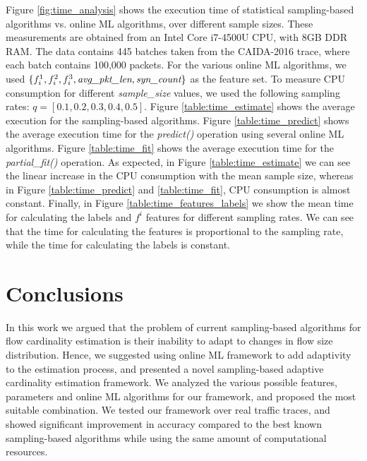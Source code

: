 		Figure \ref{fig:time_analysis} shows the execution time of statistical sampling-based algorithms vs. online
		ML algorithms, over different sample sizes. These measurements are obtained from an Intel Core i7-4500U CPU,
		with 8GB DDR RAM. The data contains 445 batches taken from the CAIDA-2016 trace, where each batch contains
		100,000 packets. For the various online ML algorithms, we used $\{f_i^1, f_i^2, f_i^3, \emph{avg\_pkt\_len},
		\emph{syn\_count}\}$ as the feature set. To measure CPU consumption for different \emph{sample\_size} values,
		we used the following sampling rates: $q = [0.1, 0.2, 0.3, 0.4, 0.5]$. Figure \ref{table:time_estimate}
		shows the average execution for the sampling-based algorithms.  Figure \ref{table:time_predict} shows
		the average execution time for the \emph{predict()} operation using several online ML algorithms. Figure
		\ref{table:time_fit} shows the average execution time for the \emph{partial\_fit()} operation. As expected, in
		Figure \ref{table:time_estimate} we can see the linear increase in the CPU consumption with the mean sample
		size, whereas in Figure \ref{table:time_predict} and \ref{table:time_fit}, CPU consumption is almost constant.
                Finally, in Figure \ref{table:time_features_labels} we show the mean time for calculating the labels 
                 and $f^i$ features for different sampling rates. 
                 We can see that the time for calculating the features is proportional to the sampling rate, 
                 while the time for calculating the labels is constant.

\section{Conclusions} \label{sec:conclusions}
	
		In this work we argued that the problem of current sampling-based algorithms for flow cardinality estimation is their inability to adapt to changes in flow size distribution. Hence, we suggested using online ML framework to add adaptivity to the estimation process, and presented a novel sampling-based adaptive cardinality estimation framework. We analyzed the various possible features, parameters and online ML algorithms for our framework, and proposed the most suitable combination. We tested our framework over real traffic traces, and showed significant improvement in accuracy compared to the best known sampling-based algorithms while using the same amount of computational resources.
	
